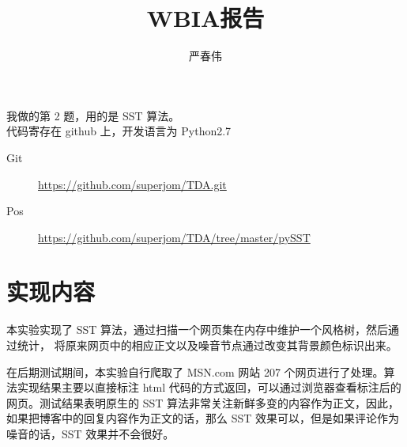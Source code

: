 \documentclass[a4paper]{ctexart}
\author{严春伟}
\title{WBIA报告}
\begin{document}
    \maketitle
我做的第 2 题，用的是 SST 算法。 \\
代码寄存在 github 上，开发语言为 Python2.7   
    \begin{description}
        \item [Git] \href{https://github.com/superjom/TDA.git}{https://github.com/superjom/TDA.git}
        \item [Pos] \href{https://github.com/superjom/TDA/tree/master/pySST}{https://github.com/superjom/TDA/tree/master/pySST}
    \end{description}

\section{实现内容}
本实验实现了 SST 算法，通过扫描一个网页集在内存中维护一个风格树，然后通过统计，
将原来网页中的相应正文以及噪音节点通过改变其背景颜色标识出来。
\par 在后期测试期间，本实验自行爬取了 MSN.com 网站 207 个网页进行了处理。算法实现结果主要以直接标注 html 代码的方式返回，可以通过浏览器查看标注后的网页。测试结果表明原生的 SST 算法非常关注新鲜多变的内容作为正文，因此，如果把博客中的回复内容作为正文的话，那么 SST 效果可以，但是如果评论作为噪音的话，SST 效果并不会很好。 \\
\end{document}
